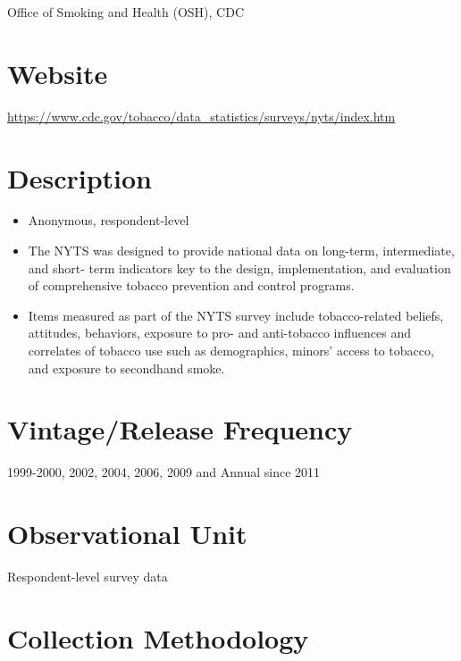 \documentclass[
]{book}
\providecommand{\tightlist}{%
  \setlength{\itemsep}{0pt}\setlength{\parskip}{0pt}}
\begin{document}
Office of Smoking and Health (OSH), CDC

\hypertarget{website-68}{%
\section{Website}\label{website-68}}

\url{https://www.cdc.gov/tobacco/data_statistics/surveys/nyts/index.htm}

\hypertarget{description-68}{%
\section{Description}\label{description-68}}

\begin{itemize}
\tightlist
\item
  Anonymous, respondent-level
\item
  The NYTS was designed to provide national data on long-term, intermediate, and short- term indicators key to the design, implementation, and evaluation of comprehensive tobacco prevention and control programs.
\item
  Items measured as part of the NYTS survey include tobacco-related beliefs, attitudes, behaviors, exposure to pro- and anti-tobacco influences and correlates of tobacco use such as demographics, minors' access to tobacco, and exposure to secondhand smoke.
\end{itemize}

\hypertarget{vintagerelease-frequency-68}{%
\section{Vintage/Release Frequency}\label{vintagerelease-frequency-68}}

1999-2000, 2002, 2004, 2006, 2009 and Annual since 2011

\hypertarget{observational-unit-68}{%
\section{Observational Unit}\label{observational-unit-68}}

Respondent-level survey data

\hypertarget{collection-methodology-68}{%
\section{Collection Methodology}\label{collection-methodology-68}}
\end{document}
